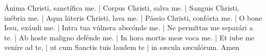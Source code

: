 Ánima Christi, sanctífica me. | Corpus Christi, salva me. | Sanguis Christi, inébria me. | Aqua láteris Christi, lava me. |
Pássio Christi, confórta me. | O bone Iesu, exáudi me. | Intra tua vúlnera abscónde me. | Ne permíttas me separári a te. |
Ab hoste maligno defénde me. | In hora mortis me{\ae} voca me. | Et iube me veníre ad te, | ut cum Sanctis tuis laudem te | 
in s{\ae}cula s{\ae}culórum. Amen